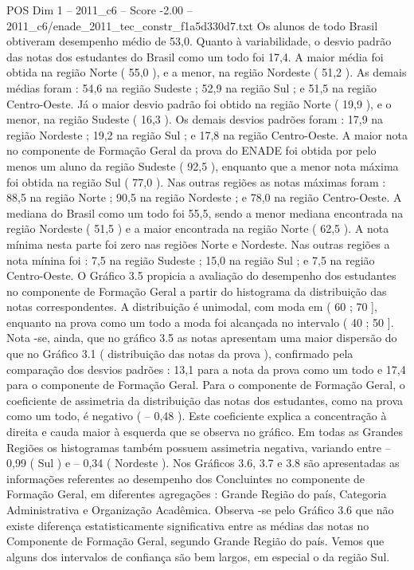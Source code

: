 \begin{textsample}{POS Dim 1 – 2011\_c6 – Score -2.00 – 2011\_c6/enade\_2011\_tec\_constr\_f1a5d330d7.txt}
Os alunos de todo Brasil obtiveram desempenho médio de 53,0.
Quanto à variabilidade, o desvio padrão das notas dos estudantes do Brasil como um todo foi 17,4.
A maior média foi obtida na região Norte ( 55,0 ), e a menor, na região Nordeste ( 51,2 ).
As demais médias foram : 54,6 na região Sudeste ; 52,9 na região Sul ; e 51,5 na região Centro-Oeste.
Já o maior desvio padrão foi obtido na região Norte ( 19,9 ), e o menor, na região Sudeste ( 16,3 ).
Os demais desvios padrões foram : 17,9 na região Nordeste ; 19,2 na região Sul ; e 17,8 na região Centro-Oeste.
A maior nota no componente de Formação Geral da prova do ENADE foi obtida por pelo menos um aluno da região Sudeste ( 92,5 ), enquanto que a menor nota máxima foi obtida na região Sul ( 77,0 ).
Nas outras regiões as notas máximas foram : 88,5 na região Norte ; 90,5 na região Nordeste ; e 78,0 na região Centro-Oeste.
A mediana do Brasil como um todo foi 55,5, sendo a menor mediana encontrada na região Nordeste ( 51,5 ) e a maior encontrada na região Norte ( 62,5 ).
A nota mínima nesta parte foi zero nas regiões Norte e Nordeste.
Nas outras regiões a nota mínina foi : 7,5 na região Sudeste ; 15,0 na região Sul ; e 7,5 na região Centro-Oeste.
O Gráfico 3.5 propicia a avaliação do desempenho dos estudantes no componente de Formação Geral a partir do histograma da distribuição das notas correspondentes.
A distribuição é unimodal, com moda em ( 60 ; 70 ], enquanto na prova como um todo a moda foi alcançada no intervalo ( 40 ; 50 ].
Nota -se, ainda, que no gráfico 3.5 as notas apresentam uma maior dispersão do que no Gráfico 3.1 ( distribuição das notas da prova ), confirmado pela comparação dos desvios padrões : 13,1 para a nota da prova como um todo e 17,4 para o componente de Formação Geral.
Para o componente de Formação Geral, o coeficiente de assimetria da distribuição das notas dos estudantes, como na prova como um todo, é negativo ( – 0,48 ).
Este coeficiente explica a concentração à direita e cauda maior à esquerda que se observa no gráfico.
Em todas as Grandes Regiões os histogramas também possuem assimetria negativa, variando entre – 0,99 ( Sul ) e – 0,34 ( Nordeste ).
Nos Gráficos 3.6, 3.7 e 3.8 são apresentadas as informações referentes ao desempenho dos Concluintes no componente de Formação Geral, em diferentes agregações : Grande Região do país, Categoria Administrativa e Organização Acadêmica.
Observa -se pelo Gráfico 3.6 que não existe diferença estatisticamente significativa entre as médias das notas no Componente de Formação Geral, segundo Grande Região do país.
Vemos que alguns dos intervalos de confiança são bem largos, em especial o da região Sul.

\end{textsample}
